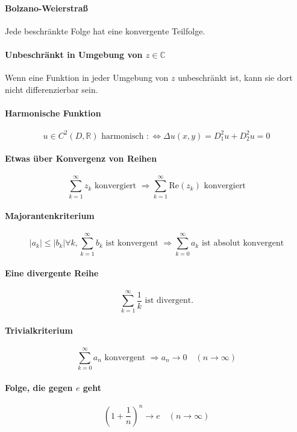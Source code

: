 \documentclass[a4paper, 10pt, DIV20, headings=small]{scrartcl}
\theoremstyle{definition}
\theoremstyle{plain}
\begin{document}
\paragraph{Bolzano-Weierstraß}
Jede beschränkte Folge hat eine konvergente Teilfolge.

\paragraph{Unbeschränkt in Umgebung von $z \in \mathbb{C}$}
Wenn eine Funktion in jeder Umgebung von $z$ unbeschränkt ist, kann sie dort nicht differenzierbar sein.

\paragraph{Harmonische Funktion}
$$u \in C^2(D,\mathbb{R}) \text{ harmonisch } :\Leftrightarrow \Delta u(x,y) = D_1^2 u + D_2^2 u = 0$$

\paragraph{Etwas über Konvergenz von Reihen}
$$\sum\limits_{k=1}^\infty{z_k} \text{ konvergiert } \Rightarrow \sum\limits_{k=1}^\infty{\text{Re}(z_k)} \text{ konvergiert}$$

\paragraph{Majorantenkriterium}
$$|a_k| \leq |b_k| \forall k, \sum\limits_{k=1}^{\infty}{b_k} \text{ ist konvergent } \Rightarrow \sum\limits_{k=0}^\infty {a_k} \text{ ist absolut konvergent}$$

\paragraph{Eine divergente Reihe}
$$\sum\limits_{k=1}^\infty{\frac{1}{k}} \text{ ist divergent.}$$


\paragraph{Trivialkriterium}
$$\sum\limits_{k=0}^{\infty}a_n \text{ konvergent } \Rightarrow a_n \rightarrow 0 \quad (n \rightarrow \infty)$$

\paragraph{Folge, die gegen $e$ geht}
$$\left(1+\frac{1}{n}\right)^n \rightarrow e \quad (n \rightarrow \infty)$$
\end{document}
